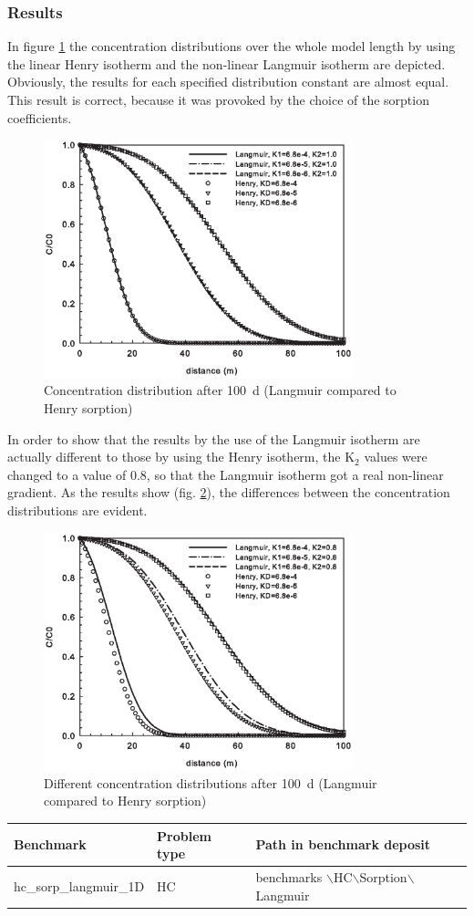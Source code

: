 \subsubsection*{Results}

In figure \ref{fig56} the concentration distributions over the whole model length by using the linear Henry isotherm and the non-linear Langmuir isotherm are depicted. Obviously, the results for each specified distribution constant are almost equal. This result is correct, because it was provoked by the choice of the sorption coefficients.

\begin{figure}[htbp]
\centering
\includegraphics[width=0.8\textwidth]{C/figures/fig56.EPS}
\caption{Concentration distribution after 100~d (Langmuir compared to Henry sorption)}
\label{fig56}
\end{figure}

In order to show that the results by the use of the Langmuir isotherm are actually different to those by using the Henry isotherm, the K$_2$ values were changed to a value of 0.8, so that the Langmuir isotherm got a real non-linear gradient. As the results show (fig. \ref{fig57}), the differences between the concentration distributions are evident.

\begin{figure}[htbp]
\centering
\includegraphics[width=0.8\textwidth]{C/figures/fig57.EPS}
\caption{Different concentration distributions after 100~d (Langmuir compared to Henry sorption)}
\label{fig57}
\end{figure}

\begin{tabular}{|l|l|l|}
\hline
Benchmark & Problem type	& Path in benchmark deposit \\
\hline	
hc\_sorp\_langmuir\_1D	& HC	& benchmarks $\backslash$HC$\backslash$Sorption$\backslash$Langmuir \\
\hline	
\end{tabular}
